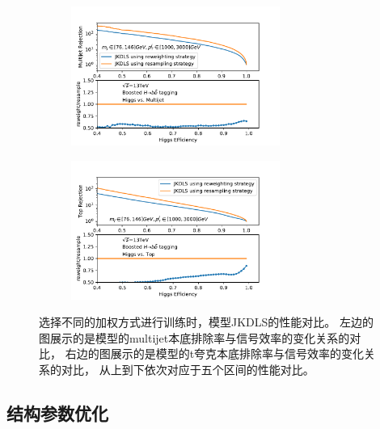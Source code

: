 \begin{figure}[htbp]
\begin{subfigure}{.5\textwidth}
   \caption{}
  \end{subfigure}
 \newline 
   \begin{subfigure}{.5\textwidth}
  \centering
   \includegraphics[width=0.75\textwidth]{figuresXbb/Reweight/QCDMASSPT3.pdf}
   \caption{}
  \end{subfigure}
  \begin{subfigure}{.5\textwidth}
  \centering
   \includegraphics[width=0.75\textwidth]{figuresXbb/Reweight/TOPMASSPT3.pdf}
   \caption{}
  \end{subfigure}
  \caption{
  选择不同的加权方式进行训练时，模型JKDLS的性能对比。
  左边的图展示的是模型的multijet本底排除率与信号效率的变化关系的对比，
右边的图展示的是模型的t夸克本底排除率与信号效率的变化关系的对比，
从上到下依次对应于五个区间的性能对比。
  }
  \label{fig:ReweightROC}
\end{figure} 




\subsection{结构参数优化}
\label{sec:XbbTagger4}

